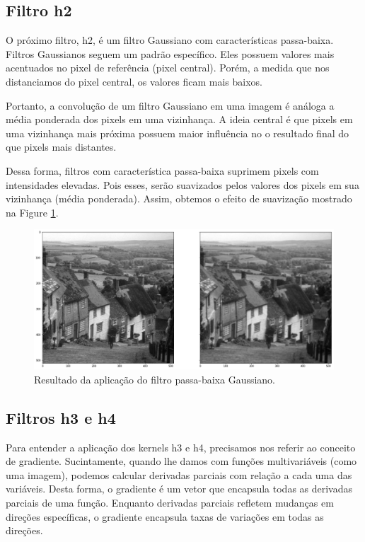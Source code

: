\documentclass[10pt,twocolumn,letterpaper]{article}
\begin{document}
\subsection{Filtro h2}

O próximo filtro, h2, é um filtro Gaussiano com características passa-baixa. Filtros Gaussianos seguem um padrão específico. Eles possuem valores mais acentuados no pixel de referência (pixel central). Porém, a medida que nos distanciamos do pixel central, os valores ficam mais baixos. 

Portanto, a convolução de um filtro Gaussiano em uma imagem é análoga a média ponderada dos pixels em uma vizinhança. A ideia central é que pixels em uma vizinhança mais próxima possuem maior influência no o resultado final do que pixels mais distantes.

Dessa forma, filtros com característica passa-baixa suprimem pixels com intensidades elevadas. Pois esses, serão suavizados pelos valores dos pixels em sua vizinhança (média ponderada). Assim, obtemos o efeito de suavização mostrado na Figure \ref{fig:filtro-passa-baixa}.

\begin{figure}
\begin{center}
	\includegraphics[width=0.99\columnwidth]{pics/gaussian_blur}
	\caption{Resultado da aplicação do filtro passa-baixa Gaussiano.\label{fig:filtro-passa-baixa}}   
\end{center} 
\end{figure}  

\subsection{Filtros h3 e h4}

Para entender a aplicação dos kernels h3 e h4, precisamos nos referir ao conceito de gradiente. Sucintamente, quando lhe damos com funções multivariáveis (como uma imagem), podemos calcular derivadas parciais com relação a cada uma das variáveis. Desta forma, o gradiente é um vetor que encapsula todas as derivadas parciais de uma função. Enquanto derivadas parciais refletem mudanças em direções específicas, o gradiente encapsula taxas de variações em todas as direções. 
\end{document}
